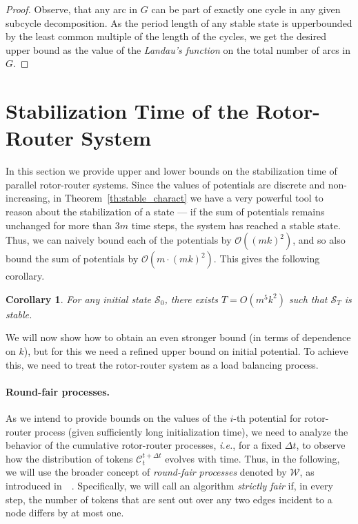 \documentclass{article}[11pt,letter]
\newtheorem{corollary}[definition]{Corollary}
\newcommand{\bigo}{\mathcal{O}}
\newcommand{\state}{\mathcal{S}}
\newcommand{\ie}{{\it i.e.}\xspace}
\newcommand{\cload}{\mathcal{C}}
\newcommand{\dt}{\Delta t}
\begin{document}
\begin{proof}
Observe, that any arc in $G$ can be part of exactly one cycle in any given subcycle decomposition. As the period length of any stable state is upperbounded by the least common multiple of the length of the cycles, we get the desired upper bound as the value of the \emph{Landau's function} on the total number of arcs in $G$.
\end{proof}

\section{Stabilization Time of the Rotor-Router System}
\label{sec:stab}
In this section we provide upper and lower bounds on the stabilization time of parallel rotor-router systems.
Since the values of potentials are discrete and non-increasing, in Theorem~\ref{th:stable_charact} we have a very powerful tool to reason about the stabilization of a state --- if the sum of potentials remains unchanged for more than $3m$ time steps, the system has reached a stable state. Thus, we can naively bound each of the potentials by $\bigo((mk)^2)$, and so also bound the sum of potentials by $\bigo(m \cdot (mk)^2)$. This gives the following corollary.

\begin{corollary}
For any initial state $\state_0$, there exists $T = O(m^5k^2)$ such that $\state_T$ is stable.
\end{corollary}

We will now show how to obtain an even stronger bound (in terms of dependence on $k$), but for this we need a refined upper bound on initial potential. To achieve this, we need to treat the rotor-router system as a load balancing process.

\paragraph{Round-fair processes.} As we intend to provide bounds on the values of the $i$-th potential for rotor-router process (given sufficiently long initialization time), we need to analyze the behavior of the cumulative rotor-router processes, \ie, for a fixed $\dt$, to observe how the distribution of tokens $\cload_{t}^{t+\dt}$ evolves with time. Thus, in the following, we will use the broader concept of \emph{round-fair processes} denoted by $\mathcal{W}$, as introduced in~~\cite{RSW98}.  Specifically, we will call an algorithm \emph{strictly fair} if, in every step, the number of tokens that are sent out over any two edges incident to a node differs by at most one.
\end{document}
